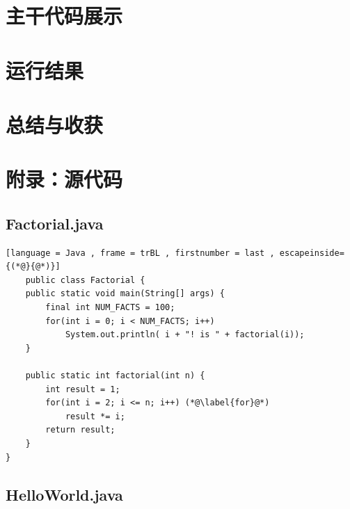 \documentclass[UTF8]{ctexart}
\begin{document}
\section{主干代码展示}
\section{运行结果}
\section{总结与收获}
\newpage
\appendix
\section{附录：源代码}
\subsection{Factorial.java}
\begin{lstlisting}[language = Java , frame = trBL , firstnumber = last , escapeinside={(*@}{@*)}]
    public class Factorial {
    public static void main(String[] args) {   
        final int NUM_FACTS = 100;
        for(int i = 0; i < NUM_FACTS; i++)
            System.out.println( i + "! is " + factorial(i));
    }

    public static int factorial(int n) {
        int result = 1;
        for(int i = 2; i <= n; i++) (*@\label{for}@*)
            result *= i;
        return result;
    }
}
\end{lstlisting}
\subsection{HelloWorld.java}

\end{document}
